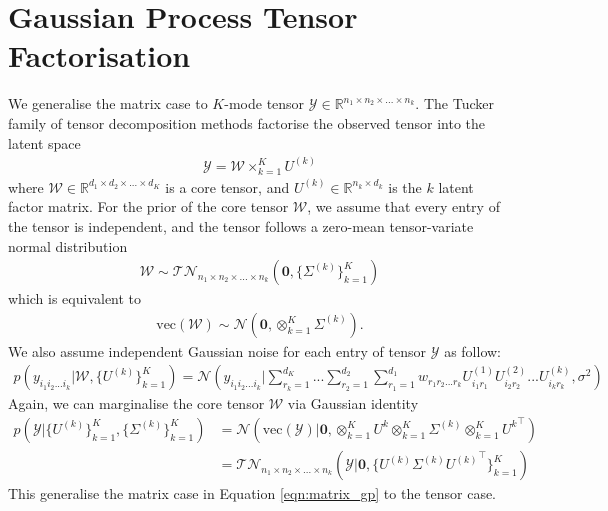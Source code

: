 \documentclass{article} %
\theoremstyle{definition}
\newcommand\mb{\mathbf}
\newcommand\mc{\mathcal}
\begin{document}
\section{Gaussian Process Tensor Factorisation}
We generalise the matrix case to $K$-mode tensor $\mc{Y} \in \mathbb{R}^{n_1 \times n_2 \times ... \times n_k}$. The Tucker family of tensor decomposition methods factorise the observed tensor into the latent space
\begin{align}
\mc{Y} = \mc{W} \times_{k=1}^{K} U^{(k)}
\end{align}
where $\mc{W} \in \mathbb{R}^{d_1 \times d_2 \times ... \times d_K}$ is a core tensor, and $U^{(k)} \in \mathbb{R}^{n_{k} \times d_k}$ is the $k$ latent factor matrix. For the prior of the core tensor $\mc{W}$, we assume that every entry of the tensor is independent, and the tensor follows a zero-mean tensor-variate normal distribution
\begin{align}
\mc{W} \sim \mc{TN}_{n_1 \times n_2 \times ... \times n_k}(\mb{0}, \{\Sigma^{(k)}\}_{k=1}^{K})
\end{align}
which is equivalent to
\begin{align}
\text{vec}(\mc{W}) \sim \mc{N}(\mb{0}, \otimes_{k=1}^{K} \Sigma^{(k)}).
\end{align}
We also assume independent Gaussian noise for each entry of tensor $\mc{Y}$ as follow:
\begin{align}
p(y_{i_1i_2...i_k}|\mc{W}, \{U^{(k)}\}_{k=1}^{K}) = \mc{N}(y_{i_1i_2...i_k}|\sum_{r_k=1}^{d_K}...\sum_{r_2=1}^{d_2}\sum_{r_1=1}^{d_1} w_{r_{1}r_{2}...r_{k}} U^{(1)}_{i_1r_1}U^{(2)}_{i_2r_2}...U^{(k)}_{i_kr_k}, \sigma^2)
\end{align}
Again, we can marginalise the core tensor $\mc{W}$ via Gaussian identity
\begin{align}
p(\mc{Y}|\{U^{(k)}\}_{k=1}^{K}, \{\Sigma^{(k)}\}_{k=1}^{K}) & = \mc{N}(\text{vec}(\mc{Y})| \mb{0}, \otimes_{k=1}^{K}U^{k} \otimes_{k=1}^{K}\Sigma^{(k)} {\otimes_{k=1}^{K}U^{k}}^\top) \\
& = \mc{TN}_{n_1 \times n_2 \times ... \times n_k}(\mc{Y}| \mb{0}, \{U^{(k)}\Sigma^{(k)}{U^{(k)}}^\top \}_{k=1}^{K})
\end{align}
This generalise the matrix case in Equation \ref{eqn:matrix_gp} to the tensor case.

\appendix
\end{document}
